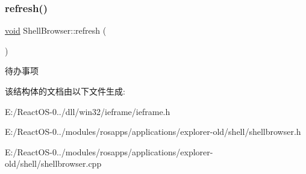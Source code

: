 \mbox{\label{struct_shell_browser_ab8cc56ea36be84287a8e7d7d1ee0f7d5}} 
\subsubsection{\texorpdfstring{refresh()}{refresh()}}
{\footnotesize\ttfamily \hyperlink{interfacevoid}{void} Shell\+Browser\+::refresh (\begin{DoxyParamCaption}{ }\end{DoxyParamCaption})\hspace{0.3cm}{\ttfamily [protected]}}

\begin{DoxyRefDesc}{待办事项}
\item[\hyperlink{todo__todo000046}{待办事项}]\end{DoxyRefDesc}


该结构体的文档由以下文件生成\+:\begin{DoxyCompactItemize}
\item 
E\+:/\+React\+O\+S-\/0../dll/win32/ieframe/ieframe.\+h\item 
E\+:/\+React\+O\+S-\/0../modules/rosapps/applications/explorer-\/old/shell/shellbrowser.\+h\item 
E\+:/\+React\+O\+S-\/0../modules/rosapps/applications/explorer-\/old/shell/shellbrowser.\+cpp\end{DoxyCompactItemize}
